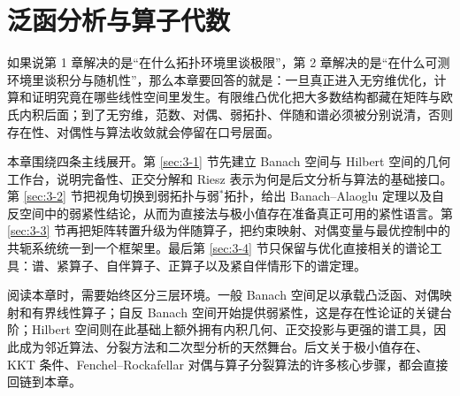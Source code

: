 \chapter{泛函分析与算子代数}

\label{chap:03}

如果说第 1 章解决的是“在什么拓扑环境里谈极限”，第 2 章解决的是“在什么可测环境里谈积分与随机性”，那么本章要回答的就是：一旦真正进入无穷维优化，计算和证明究竟在哪些线性空间里发生。有限维凸优化把大多数结构都藏在矩阵与欧氏内积后面；到了无穷维，范数、对偶、弱拓扑、伴随和谱必须被分别说清，否则存在性、对偶性与算法收敛就会停留在口号层面。

本章围绕四条主线展开。第 \ref{sec:3-1} 节先建立 Banach 空间与 Hilbert 空间的几何工作台，说明完备性、正交分解和 Riesz 表示为何是后文分析与算法的基础接口。第 \ref{sec:3-2} 节把视角切换到弱拓扑与弱$^\ast$拓扑，给出 Banach--Alaoglu 定理以及自反空间中的弱紧性结论，从而为直接法与极小值存在准备真正可用的紧性语言。第 \ref{sec:3-3} 节再把矩阵转置升级为伴随算子，把约束映射、对偶变量与最优控制中的共轭系统统一到一个框架里。最后第 \ref{sec:3-4} 节只保留与优化直接相关的谱论工具：谱、紧算子、自伴算子、正算子以及紧自伴情形下的谱定理。

阅读本章时，需要始终区分三层环境。一般 Banach 空间足以承载凸泛函、对偶映射和有界线性算子；自反 Banach 空间开始提供弱紧性，这是存在性论证的关键台阶；Hilbert 空间则在此基础上额外拥有内积几何、正交投影与更强的谱工具，因此成为邻近算法、分裂方法和二次型分析的天然舞台。后文关于极小值存在、KKT 条件、Fenchel--Rockafellar 对偶与算子分裂算法的许多核心步骤，都会直接回链到本章。








